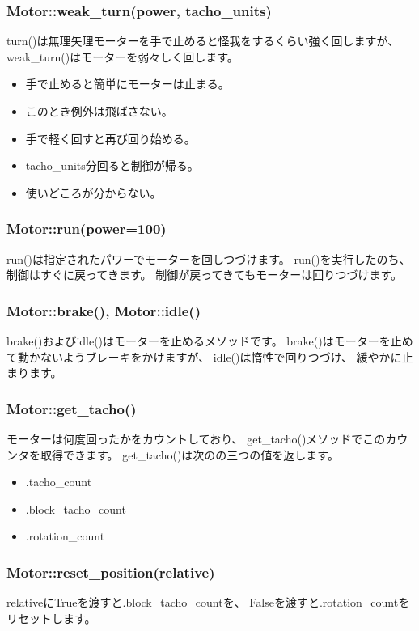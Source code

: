\documentclass[mingoth,a4paper]{jsarticle}
\begin{document}
\subsubsection{Motor::weak\_turn(power, tacho\_units)}
turn()は無理矢理モーターを手で止めると怪我をするくらい強く回しますが、
weak\_turn()はモーターを弱々しく回します。

\begin{itemize}
\item 手で止めると簡単にモーターは止まる。
\item このとき例外は飛ばさない。
\item 手で軽く回すと再び回り始める。
\item tacho\_units分回ると制御が帰る。
\item 使いどころが分からない。
\end{itemize}

\subsubsection{Motor::run(power=100)}

run()は指定されたパワーでモーターを回しつづけます。
run()を実行したのち、
制御はすぐに戻ってきます。
制御が戻ってきてもモーターは回りつづけます。

\subsubsection{Motor::brake(), Motor::idle()}
brake()およびidle()はモーターを止めるメソッドです。
brake()はモーターを止めて動かないようブレーキをかけますが、
idle()は惰性で回りつづけ、
緩やかに止まります。

\subsubsection{Motor::get\_tacho()}
モーターは何度回ったかをカウントしており、
get\_tacho()メソッドでこのカウンタを取得できます。
get\_tacho()は次のの三つの値を返します。
\begin{itemize}
\item .tacho\_count
\item .block\_tacho\_count
\item .rotation\_count
\end{itemize}

\subsubsection{Motor::reset\_position(relative)}
relativeにTrueを渡すと.block\_tacho\_countを、
Falseを渡すと.rotation\_countをリセットします。
\end{document}
